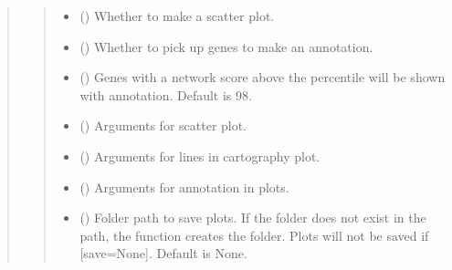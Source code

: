 \documentclass[letterpaper,10pt,english]{sphinxmanual}
\begin{document}
\begin{quote}
\begin{fulllineitems}
\begin{fulllineitems}
\begin{quote}
\begin{description}
\begin{itemize}
\item {} 
 () \textendash{} Whether to make a scatter plot.

\item {} 
 () \textendash{} Whether to pick up genes to make an annotation.

\item {} 
 () \textendash{} Genes with a network score above the percentile will be shown with annotation. Default is 98.

\item {} 
 () \textendash{} Arguments for scatter plot.

\item {} 
 () \textendash{} Arguments for lines in cartography plot.

\item {} 
 () \textendash{} Arguments for annotation in plots.

\item {} 
 () \textendash{} Folder path to save plots. If the folder does not exist in the path, the function creates the folder.
Plots will not be saved if {[}save=None{]}. Default is None.

\end{itemize}

\end{description}\end{quote}

\end{fulllineitems}



\end{fulllineitems}
\end{quote}
\end{document}

